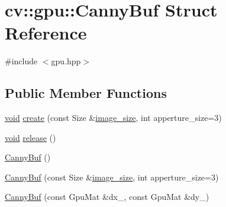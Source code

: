 \hypertarget{structcv_1_1gpu_1_1CannyBuf}{\section{cv\-:\-:gpu\-:\-:Canny\-Buf Struct Reference}
\label{structcv_1_1gpu_1_1CannyBuf}
}


{\ttfamily \#include $<$gpu.\-hpp$>$}

\subsection*{Public Member Functions}
\begin{DoxyCompactItemize}
\item 
\hyperlink{legacy_8hpp_a8bb47f092d473522721002c86c13b94e}{void} \hyperlink{structcv_1_1gpu_1_1CannyBuf_a4b6cbaa197d79add9cfd5aa3582cdeec}{create} (const Size \&\hyperlink{calib3d_8hpp_a3c5695da25794e723582c8b5ccff544c}{image\-\_\-size}, int apperture\-\_\-size=3)
\item 
\hyperlink{legacy_8hpp_a8bb47f092d473522721002c86c13b94e}{void} \hyperlink{structcv_1_1gpu_1_1CannyBuf_ac20d7eaabee385bb51f0c0f4827402ab}{release} ()
\item 
\hyperlink{structcv_1_1gpu_1_1CannyBuf_a2788093ffe61d1af32484005a60c6211}{Canny\-Buf} ()
\item 
\hyperlink{structcv_1_1gpu_1_1CannyBuf_af5a9c842d97c145fda247faafd9de5f4}{Canny\-Buf} (const Size \&\hyperlink{calib3d_8hpp_a3c5695da25794e723582c8b5ccff544c}{image\-\_\-size}, int apperture\-\_\-size=3)
\item 
\hyperlink{structcv_1_1gpu_1_1CannyBuf_aa0b661fdaa1b8c8d9617b0c188d41c78}{Canny\-Buf} (const Gpu\-Mat \&dx\-\_\-, const Gpu\-Mat \&dy\-\_\-)
\end{DoxyCompactItemize}
